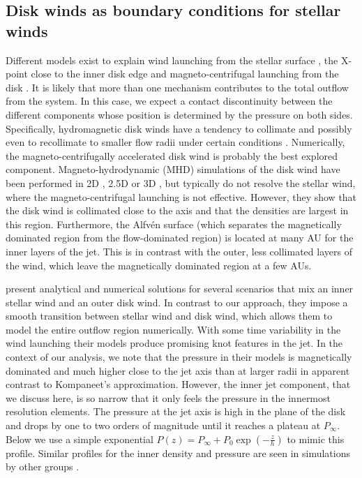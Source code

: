 \documentclass[manuscript]{aastex}
\begin{document}
\subsection{Disk winds as boundary conditions for stellar winds}
\label{sect:boundary}
Different models exist to explain wind launching from the stellar surface \citep{1988ApJ...332L..41K,2005ApJ...632L.135M}, the X-point close to the inner disk edge \citep{1994ApJ...429..781S} and magneto-centrifugal launching from the disk \citep{1982MNRAS.199..883B,2005ApJ...630..945A}. It is likely that more than one mechanism contributes to the total outflow from the system. In this case, we expect a contact discontinuity between the different components whose position is determined by the pressure on both sides. Specifically, hydromagnetic disk winds have a tendency to collimate and possibly even to recollimate to smaller flow radii under certain conditions \citep{1982MNRAS.199..883B,1992ApJ...394..117P}.
Numerically, the magneto-centrifugally accelerated disk wind is probably the best explored component. Magneto-hydrodynamic (MHD) simulations of the disk wind have been performed in 2D \citep[e.g.][]{2005ApJ...630..945A}, 2.5D \citep[e.g.][]{2011ApJ...728L..11R} or 3D \citep[e.g.][]{2006ApJ...653L..33A}, but typically do not resolve the stellar wind, where the magneto-centrifugal launching is not effective. However, they show that the disk wind is collimated close to the axis and that the densities are largest in this region. Furthermore, the Alfv\'en surface (which separates the magnetically dominated region from the flow-dominated region) is located at many AU for the inner layers of the jet. This is in contrast with the outer, less collimated layers of the wind, which leave the magnetically dominated region at a few AUs.

\citet{2009A&A...502..217M} present analytical and numerical solutions for several scenarios that mix an inner stellar wind and an outer disk wind. In contrast to our approach, they impose a smooth transition between stellar wind and disk wind, which allows them to model the entire outflow region numerically. With some time variability in the wind launching their models produce promising knot features in the jet. In the context of our analysis, we note that the pressure in their models is magnetically dominated and much higher close to the jet axis than at larger radii in apparent contrast to Kompaneet's approximation. However, the inner jet component, that we discuss here, is so narrow that it only feels the pressure in the innermost resolution elements. The pressure at the jet axis is high in the plane of the disk and drops by one to two orders of magnitude until it reaches a plateau at $P_\infty$. Below we use a simple exponential $P(z)=P_\infty+P_0\exp\left(-\frac{z}{h}\right)$ to mimic this profile.
Similar profiles for the inner density and pressure are seen in simulations by other groups \citep[e.g.][]{2005ApJ...630..945A,Li_Krasnopolsky_Blandford_2006,2008ApJ...678.1109M}.
\end{document}
